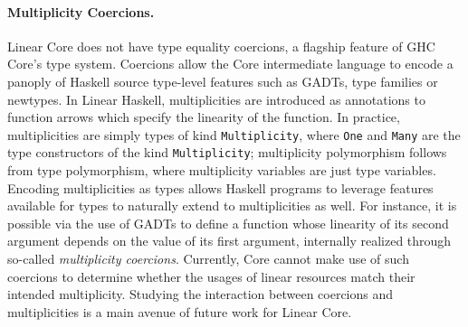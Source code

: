 \documentclass[acmsmall,review,anonymous]{acmart}
\newcommand{\incode}[1]{\lstinline{#1}}
\begin{document}
\paragraph{Multiplicity Coercions.}
Linear Core does not have type equality coercions, a flagship feature of GHC
Core's type system.
%
Coercions %
allow the Core intermediate language to encode a panoply of Haskell source
type-level features such as GADTs, type families or newtypes.
%
In Linear Haskell, multiplicities are introduced as annotations to function
arrows which specify the linearity of the function. In practice,
multiplicities are simply types of kind \incode{Multiplicity}, where \incode{One} and \incode{Many}
are the type constructors of the kind \incode{Multiplicity}; multiplicity polymorphism
follows from type polymorphism, where multiplicity variables are
just type variables. Encoding multiplicities as types allows Haskell programs
to leverage features available for types to naturally extend to multiplicities
as well.
For instance, it is possible via the use of GADTs to define a
function whose linearity of its second argument depends on the value
of its first argument, internally realized through so-called
\emph{multiplicity coercions}. Currently, Core cannot make use of such
coercions to determine whether the usages of linear resources match
their intended multiplicity. Studying the interaction between coercions and multiplicities is a main avenue
of future work for Linear Core.
%


\end{document}
